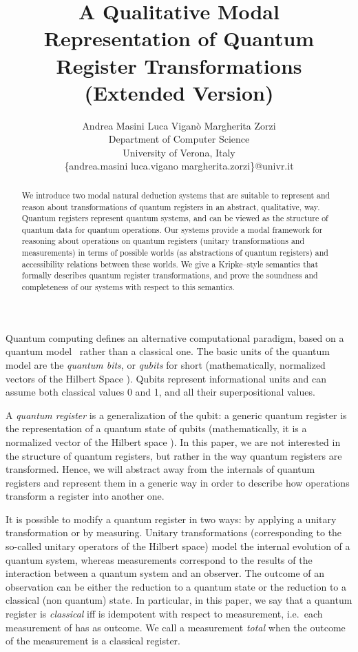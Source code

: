 \documentclass[times, 10pt]{article}
\title{A Qualitative Modal Representation of Quantum Register Transformations \\
(Extended Version)}
\author{Andrea Masini \qquad Luca Vigan\`o \qquad Margherita Zorzi  \\
Department of Computer Science \\
University of Verona, Italy \\
\{andrea.masini  luca.vigano  margherita.zorzi\}@univr.it}
\begin{document}
\maketitle
\thispagestyle{empty}

\begin{abstract}
  We introduce two modal natural deduction systems that are suitable to
  represent and reason about transformations of quantum registers in an abstract, qualitative, way.
  Quantum registers represent quantum systems, and can be viewed as the 
  structure of quantum data for quantum operations. 
  Our systems provide a modal framework for reasoning about operations on quantum registers (unitary transformations and measurements)
  in terms of possible worlds (as abstractions of quantum registers) and accessibility relations between these worlds. We give a Kripke--style
  semantics that formally describes quantum register transformations, and prove the 
  soundness and completeness of our systems with respect to this semantics.
\end{abstract}


Quantum computing 
defines an alternative computational paradigm, based on a quantum 
model~\cite{BasDa05short} rather than a classical one. The basic units of the quantum model are the 
\textit{quantum bits}, or \textit{qubits} for short (mathematically, normalized vectors of the Hilbert Space 
).  Qubits represent informational units and can assume both classical values 0 and 1, and all their superpositional values.

A \emph{quantum register} is a generalization of the qubit: a generic quantum register is the representation of a quantum state of  qubits (mathematically, it is a normalized vector of the
Hilbert space ). In this paper, we are not interested in the structure of  quantum registers, but rather in the way quantum registers are transformed. Hence, we will abstract away from the internals of quantum registers and represent them in a generic way in order to 
describe how operations transform a register into another one.

It is possible to modify a quantum register in two ways: by applying a unitary transformation 
or by measuring.  Unitary transformations (corresponding to the so-called unitary operators of 
the Hilbert space) model the internal evolution of a quantum system, whereas measurements 
correspond to the results of the interaction between a quantum system and an observer.  
The outcome of an observation can be either the reduction to a quantum
state or the reduction to a classical (non quantum) state. 
In particular, in this paper, we say that a quantum register  is \emph{classical} iff  is idempotent with respect to measurement, i.e.~each measurement of  has  as outcome. 
We call a measurement \emph{total} when the outcome of the measurement 
is a classical register.
\end{document}
